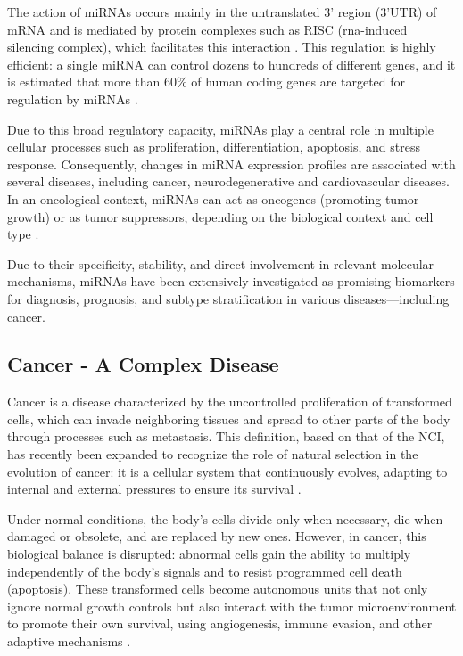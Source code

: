 The action of miRNAs occurs mainly in the untranslated 3' region (3'UTR) of
mRNA and is mediated by protein complexes such as RISC (\gls{rna}-induced
silencing complex), which facilitates this interaction
\textcite{regulatory_mecha_mirnaGulyaeva2016}. This regulation is highly
efficient: a single miRNA can control dozens to hundreds of different genes,
and it is estimated that more than $60\%$ of human coding genes are targeted
for regulation by miRNAs \textcite{role_mirna_Calaf2023}.

Due to this broad regulatory capacity, miRNAs play a central role in multiple
cellular processes such as proliferation, differentiation, apoptosis, and
stress response. Consequently, changes in miRNA expression profiles are
associated with several diseases, including cancer, neurodegenerative and
cardiovascular diseases. In an oncological context, miRNAs can act as oncogenes
(promoting tumor growth) or as tumor suppressors, depending on the biological
context and cell type \textcite{regulatory_mecha_mirnaGulyaeva2016}.

Due to their specificity, stability, and direct involvement in relevant
molecular mechanisms, miRNAs have been extensively investigated as promising
biomarkers for diagnosis, prognosis, and subtype stratification in various
diseases—including cancer.

\subsection*{Cancer - A Complex Disease}
Cancer is a disease characterized by the uncontrolled proliferation of
transformed cells, which can invade neighboring tissues and spread to other
parts of the body through processes such as metastasis. This definition, based
on that of the NCI, has recently been expanded to recognize the role of natural
selection in the evolution of cancer: it is a cellular system that continuously
evolves, adapting to internal and external pressures to ensure its survival
\textcite{def_of_cancer_Brown2023,NCI2021}.

Under normal conditions, the body's cells divide only when necessary, die when
damaged or obsolete, and are replaced by new ones. However, in cancer, this
biological balance is disrupted: abnormal cells gain the ability to multiply
independently of the body's signals and to resist programmed cell death
(apoptosis). These transformed cells become autonomous units that not only
ignore normal growth controls but also interact with the tumor microenvironment
to promote their own survival, using angiogenesis, immune evasion, and other
adaptive mechanisms \textcite{def_of_cancer_Brown2023,NCI2021}.

